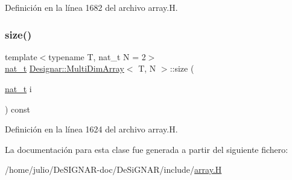 Definición en la línea 1682 del archivo array.\+H.

\mbox{\label{class_designar_1_1_multi_dim_array_a39d5dcd40ce04bf3113c0f6d83805d0a}} 
\subsubsection{\texorpdfstring{size()}{size()}}
{\footnotesize\ttfamily template$<$typename T, nat\+\_\+t N = 2$>$ \\
\hyperlink{namespace_designar_aa72662848b9f4815e7bf31a7cf3e33d1}{nat\+\_\+t} \hyperlink{class_designar_1_1_multi_dim_array}{Designar\+::\+Multi\+Dim\+Array}$<$ T, N $>$\+::size (\begin{DoxyParamCaption}\item[{\hyperlink{namespace_designar_aa72662848b9f4815e7bf31a7cf3e33d1}{nat\+\_\+t}}]{i }\end{DoxyParamCaption}) const\hspace{0.3cm}{\ttfamily [inline]}}



Definición en la línea 1624 del archivo array.\+H.



La documentación para esta clase fue generada a partir del siguiente fichero\+:\begin{DoxyCompactItemize}
\item 
/home/julio/\+De\+S\+I\+G\+N\+A\+R-\/doc/\+De\+Si\+G\+N\+A\+R/include/\hyperlink{array_8_h}{array.\+H}\end{DoxyCompactItemize}
